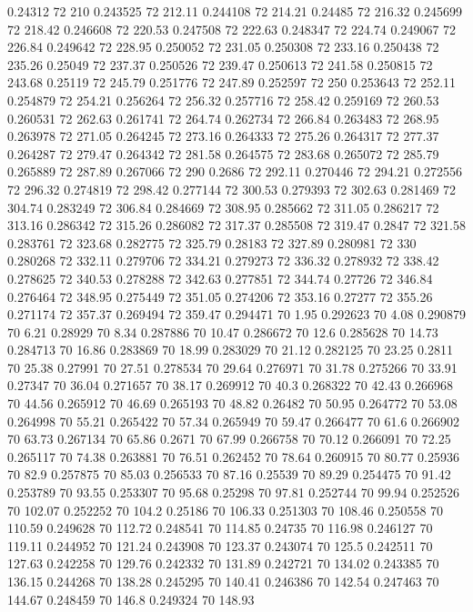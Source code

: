 0.24312 72 210
0.243525 72 212.11
0.244108 72 214.21
0.24485 72 216.32
0.245699 72 218.42
0.246608 72 220.53
0.247508 72 222.63
0.248347 72 224.74
0.249067 72 226.84
0.249642 72 228.95
0.250052 72 231.05
0.250308 72 233.16
0.250438 72 235.26
0.25049 72 237.37
0.250526 72 239.47
0.250613 72 241.58
0.250815 72 243.68
0.25119 72 245.79
0.251776 72 247.89
0.252597 72 250
0.253643 72 252.11
0.254879 72 254.21
0.256264 72 256.32
0.257716 72 258.42
0.259169 72 260.53
0.260531 72 262.63
0.261741 72 264.74
0.262734 72 266.84
0.263483 72 268.95
0.263978 72 271.05
0.264245 72 273.16
0.264333 72 275.26
0.264317 72 277.37
0.264287 72 279.47
0.264342 72 281.58
0.264575 72 283.68
0.265072 72 285.79
0.265889 72 287.89
0.267066 72 290
0.2686 72 292.11
0.270446 72 294.21
0.272556 72 296.32
0.274819 72 298.42
0.277144 72 300.53
0.279393 72 302.63
0.281469 72 304.74
0.283249 72 306.84
0.284669 72 308.95
0.285662 72 311.05
0.286217 72 313.16
0.286342 72 315.26
0.286082 72 317.37
0.285508 72 319.47
0.2847 72 321.58
0.283761 72 323.68
0.282775 72 325.79
0.28183 72 327.89
0.280981 72 330
0.280268 72 332.11
0.279706 72 334.21
0.279273 72 336.32
0.278932 72 338.42
0.278625 72 340.53
0.278288 72 342.63
0.277851 72 344.74
0.27726 72 346.84
0.276464 72 348.95
0.275449 72 351.05
0.274206 72 353.16
0.27277 72 355.26
0.271174 72 357.37
0.269494 72 359.47
0.294471 70 1.95
0.292623 70 4.08
0.290879 70 6.21
0.28929 70 8.34
0.287886 70 10.47
0.286672 70 12.6
0.285628 70 14.73
0.284713 70 16.86
0.283869 70 18.99
0.283029 70 21.12
0.282125 70 23.25
0.2811 70 25.38
0.27991 70 27.51
0.278534 70 29.64
0.276971 70 31.78
0.275266 70 33.91
0.27347 70 36.04
0.271657 70 38.17
0.269912 70 40.3
0.268322 70 42.43
0.266968 70 44.56
0.265912 70 46.69
0.265193 70 48.82
0.26482 70 50.95
0.264772 70 53.08
0.264998 70 55.21
0.265422 70 57.34
0.265949 70 59.47
0.266477 70 61.6
0.266902 70 63.73
0.267134 70 65.86
0.2671 70 67.99
0.266758 70 70.12
0.266091 70 72.25
0.265117 70 74.38
0.263881 70 76.51
0.262452 70 78.64
0.260915 70 80.77
0.25936 70 82.9
0.257875 70 85.03
0.256533 70 87.16
0.25539 70 89.29
0.254475 70 91.42
0.253789 70 93.55
0.253307 70 95.68
0.25298 70 97.81
0.252744 70 99.94
0.252526 70 102.07
0.252252 70 104.2
0.25186 70 106.33
0.251303 70 108.46
0.250558 70 110.59
0.249628 70 112.72
0.248541 70 114.85
0.24735 70 116.98
0.246127 70 119.11
0.244952 70 121.24
0.243908 70 123.37
0.243074 70 125.5
0.242511 70 127.63
0.242258 70 129.76
0.242332 70 131.89
0.242721 70 134.02
0.243385 70 136.15
0.244268 70 138.28
0.245295 70 140.41
0.246386 70 142.54
0.247463 70 144.67
0.248459 70 146.8
0.249324 70 148.93
